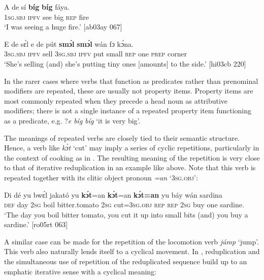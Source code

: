\ea%
    \label{ex:key:155}
    \gll A    de  sí  \textbf{bíg}  \textbf{bíg}  fáya.\\
\textsc{1sg.sbj}  \textsc{ipfv}  see  big  \textsc{rep}  fire\\

\glt ‘I was seeing a huge fire.’ [ab03ay 067]
\z


\ea%
    \label{ex:key:156}
    \gll E    de  sɛ́l  e    de  pút  \textbf{smɔ́l}  \textbf{smɔ́l}  wán  fɔ  kɔ́na.\\
\textsc{3sg.sbj}  \textsc{ipfv}  sell  \textsc{3sg.sbj}  \textsc{ipfv}  put  small  \textsc{rep}    one  \textsc{prep}  corner\\

\glt ‘She’s selling (and) she’s putting tiny ones [amounts] to the side.’ [hi03cb 220]
\z

In the rarer cases where verbs that function as predicates rather than prenominal modifiers are repeated, these are usually not property items. Property items are most commonly repeated when they precede a head noun as attributive modifiers; there is not a single instance of a repeated property item functioning as a predicate, e.g. ?\textit{e bíg bíg} ‘it is very big’. 


The meanings of repeated verbs are closely tied to their semantic structure. Hence, a verb like \textit{kɔ́t} ‘cut’ may imply a series of cyclic repetitions, particularly in the context of cooking as in . The resulting meaning of the repetition is very close to that of iterative reduplication in an example like  above. Note that this verb is repeated together with its clitic object pronoun \textit{=an} ‘\textsc{3sg.obj’}: 



\ea%
    \label{ex:key:157}
    \gll Di  dé  yu  bwɛ́l  jakató      yu  \textbf{kɔ́t}=an    \textbf{kɔ́t}=an
\textbf{kɔ́t}\textbf{\textmd{=an}}  yu  báy  wán    sardina\\
\textsc{def}  day  \textsc{2sg}  boil    bitter.tomato    \textsc{2sg}  cut=\textsc{3sg.obj}  \textsc{rep}
\textsc{rep}    \textsc{2sg}  buy  one    sardine.\\

\glt ‘The day you boil bitter tomato, you cut it up into small bits (and) you buy a sardine.’ [ro05rt 063]

\z

A similar case can be made for the repetition of the locomotion verb \textit{júmp} ‘jump’. This verb also naturally lends itself to a cyclical movement. In , reduplication and the simultaneous use of repetition of the reduplicated sequence build up to an emphatic iterative sense with a cyclical meaning: 


